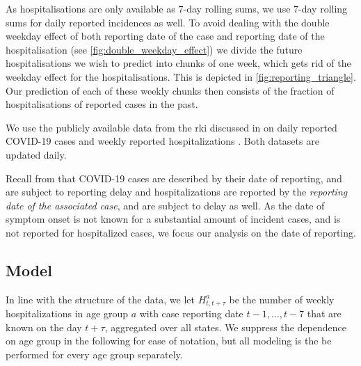 As hospitalisations are only available as \(7\)-day rolling sums, we use \(7\)-day rolling sums for daily reported incidences as well. To avoid dealing with the double weekday effect of both reporting date of the case and reporting date of the hospitalisation (see \cref{fig:double_weekday_effect}) we divide the future hospitalisations we wish to predict into chunks of one week, which gets rid of the weekday effect for the hospitalisations. This is depicted in \cref{fig:reporting_triangle}. Our prediction of each of these weekly chunks then consists of the fraction of hospitalisations of reported cases in the past.

We use the publicly available data from the \acrshort{rki} discussed in  on daily reported COVID-19 cases \citep{RobertKoch-Institut2024SARSCoV2} and weekly reported hospitalizations \citep{RobertKoch-Institut2024COVID19Hospitalisierungen}. Both datasets are updated daily.

Recall from  that COVID-19 cases are described by their date of reporting, and are subject to reporting delay and hospitalizations are reported by the \textit{reporting date of the associated case}, and are subject to delay as well. As the date of symptom onset is not known for a substantial amount of incident cases, and is not reported for hospitalized cases, we focus our analysis on the date of reporting.


\begin{figure}
    \resizebox{\textwidth}{!}{%
    }
    \caption{}
    \label{fig:delay_hospitalization_probabilities}
\end{figure}


\subsection{Model}
In line with the structure of the data, we let $H^a_{t,t + \tau}$ be the number of weekly hospitalizations in age group $a$ with case reporting date $t - 1, \dots, t - 7$ that are known on the day $t + \tau$, aggregated over all states. We suppress the dependence on age group in the following for ease of notation, but all modeling is the be performed for every age group separately.


